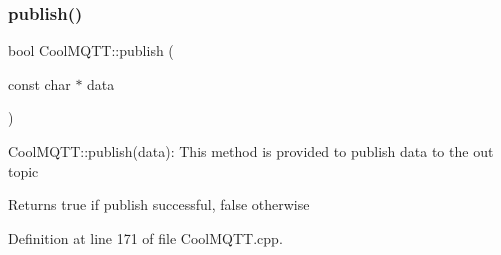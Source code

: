 \subsubsection{\texorpdfstring{publish()}{publish()}\hspace{0.1cm}{\footnotesize\ttfamily [1/2]}}
{\footnotesize\ttfamily bool Cool\+M\+Q\+T\+T\+::publish (\begin{DoxyParamCaption}\item[{const char $\ast$}]{data }\end{DoxyParamCaption})}

Cool\+M\+Q\+T\+T\+::publish(data)\+: This method is provided to publish data to the out topic

\begin{DoxyReturn}{Returns}
true if publish successful, false otherwise 
\end{DoxyReturn}


Definition at line 171 of file Cool\+M\+Q\+T\+T.\+cpp.


